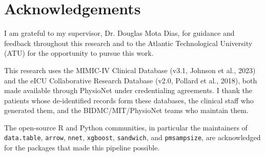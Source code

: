 \chapter*{Acknowledgements}

I am grateful to my supervisor, Dr. Douglas Mota Dias, for guidance and feedback throughout this research and to the
Atlantic Technological University (ATU) for the opportunity to pursue this work.

This research uses the MIMIC-IV Clinical Database
(v3.1, Johnson et al., 2023) and the eICU Collaborative Research Database
(v2.0, Pollard et al., 2018), both made available through PhysioNet under
credentialing agreements. I thank the patients whose de-identified records form
these databases, the clinical staff who generated them, and the BIDMC/MIT/PhysioNet
teams who maintain them.

The open-source R and Python communities, in particular the maintainers of
\texttt{data.table}, \texttt{arrow}, \texttt{nnet}, \texttt{xgboost},
\texttt{sandwich}, and \texttt{pmsampsize}, are acknowledged for the packages
that made this pipeline possible.
